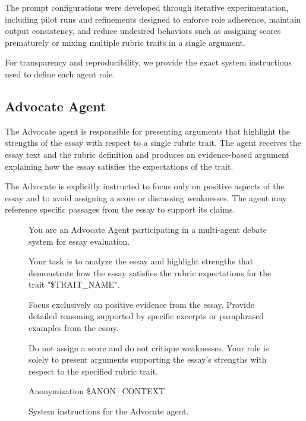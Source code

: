 \documentclass[11pt]{article}
\begin{document}
The prompt configurations were developed through iterative experimentation, including pilot runs and refinements designed to enforce role adherence, maintain output consistency, and reduce undesired behaviors such as assigning scores prematurely or mixing multiple rubric traits in a single argument.

For transparency and reproducibility, we provide the exact system instructions used to define each agent role.

\subsection{Advocate Agent}

The Advocate agent is responsible for presenting arguments that highlight the strengths of the essay with respect to a single rubric trait. The agent receives the essay text and the rubric definition and produces an evidence-based argument explaining how the essay satisfies the expectations of the trait.

The Advocate is explicitly instructed to focus only on positive aspects of the essay and to avoid assigning a score or discussing weaknesses. The agent may reference specific passages from the essay to support its claims.

\begin{figure}[h]
\centering
\begin{tcolorbox}[title=\textbf{Advocate Agent System Prompt}, colback=blue!3, colframe=blue!60]

You are an Advocate Agent participating in a multi-agent debate system for essay evaluation.

Your task is to analyze the essay and highlight strengths that demonstrate how the essay satisfies the rubric expectations for the trait "\$TRAIT\_NAME".

Focus exclusively on positive evidence from the essay. Provide detailed reasoning supported by specific excerpts or paraphrased examples from the essay.

Do not assign a score and do not critique weaknesses. Your role is solely to present arguments supporting the essay’s strengths with respect to the specified rubric trait.

Anonymization  
\$ANON\_CONTEXT

\end{tcolorbox}
\caption{System instructions for the Advocate agent.}
\label{fig:prompt_advocate}
\end{figure}
\end{document}
